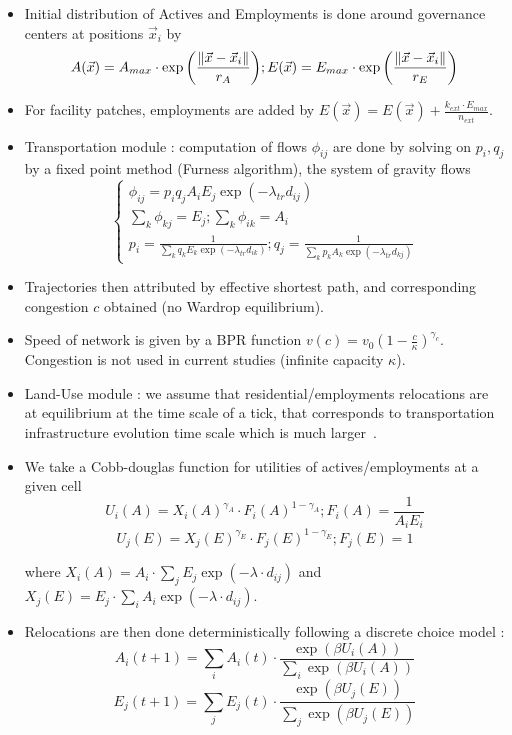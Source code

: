 \begin{itemize}
\item Initial distribution of Actives and Employments is done around governance centers at positions $\vec{x}_i$ by
\[
A(\vec{x}) = A_{max} \cdot \exp{\left(\frac{\| \vec{x}-\vec{x}_i \|}{r_A}\right)} ; 
E(\vec{x}) = E_{max} \cdot \exp{\left(\frac{\| \vec{x}-\vec{x}_i \|}{r_E}\right)}
\]

\item For facility patches, employments are added by $E(\vec{x}) = E(\vec{x})+\frac{k_{ext}\cdot E_{max}}{n_{ext}}$.

\item Transportation module : computation of flows $\phi_{ij}$ are done by solving on $p_i,q_j$ by a fixed point method (Furness algorithm), the system of gravity flows
\[
\begin{cases}
\phi_{ij} = p_i q_j A_i E_j \exp{\left(-\lambda_{tr} d_{ij}\right)}\\
\sum_k \phi_{kj} = E_j ; \sum_k \phi_{ik} = A_i\\
p_i = \frac{1}{\sum_k{q_k E_k \exp{(-\lambda_{tr}d_{ik})}}} ; q_j = \frac{1}{\sum_k{p_k A_k \exp{(-\lambda_{tr}d_{kj})}}} 
\end{cases}
\]

\item Trajectories then attributed by effective shortest path, and corresponding congestion $c$ obtained (no Wardrop equilibrium). 

\item Speed of network is given by a BPR function $v(c) = v_0 \left(1 - \frac{c}{\kappa}\right)^{\gamma_c}$. Congestion is not used in current studies (infinite capacity $\kappa$).

\item Land-Use module : we assume that residential/employments relocations are at equilibrium at the time scale of a tick, that corresponds to transportation infrastructure evolution time scale which is much larger~\cite{bretagnolle:tel-00459720}.

\item We take a Cobb-douglas function for utilities of actives/employments at a given cell
\[
U_i (A) = X_i(A)^{\gamma_A}\cdot {F_i(A)}^{1-\gamma_A} ; F_i(A) = \frac{1}{A_i E_i}
\]
\[
U_j (E) = X_j(E)^{\gamma_E}\cdot {F_j(E)}^{1-\gamma_E} ; F_j(E) = 1
\]

where $X_i(A) = A_i\cdot \sum_j{E_j \exp{\left(-\lambda\cdot d_{ij}\right)}}$ and $X_j(E) = E_j\cdot \sum_i{A_i \exp{\left(-\lambda\cdot d_{ij}\right)}}$.

\item Relocations are then done deterministically following a discrete choice model :
\[
A_i(t+1) = \sum_i{A_i(t)}\cdot\frac{\exp{(\beta U_i(A))}}{\sum_i{\exp{(\beta U_i(A))}}}
\]
\[
E_j(t+1) = \sum_j{E_j(t)}\cdot\frac{\exp{(\beta U_j(E))}}{\sum_j{\exp{(\beta U_j(E))}}}
\]

\end{itemize}


